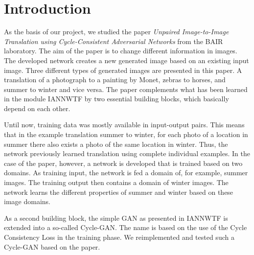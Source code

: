 \documentclass[fleqn,10pt]{SelfArx} %
\begin{document}
\maketitle
\tableofcontents
\thispagestyle{empty} %


\section*{Introduction}
As the basis of our project, we studied the paper \textit{Unpaired Image-to-Image Translation using Cycle-Consistent Adversarial Networks} from the \ac{BAIR} laboratory. The aim of the paper is to change different information in images. The developed network creates a new generated image based on an existing input image. Three different types of generated images are presented in this paper. A translation of a photograph to a painting by Monet, zebras to horses, and summer to winter and vice versa. The paper complements what has been learned in the module \ac{IANNWTF} by two essential building blocks, which basically depend on each other.~\cite{image-to-image-ccan}

Until now, training data was mostly available in input-output pairs. This means that in the example translation summer to winter, for each photo of a location in summer there also exists a photo of the same location in winter. Thus, the network previously learned translation using complete individual examples. In the case of the paper, however, a network is developed that is trained based on two domains. As training input, the network is fed a domain of, for example, summer images. The training output then contains a domain of winter images. The network learns the different properties of summer and winter based on these image domains.~\cite{image-to-image-ccan}

As a second building block, the simple \ac{GAN} as presented in \ac{IANNWTF} is extended into a so-called Cycle-\ac{GAN}. The name is based on the use of the Cycle Consistency Loss in the training phase. We reimplemented and tested such a Cycle-\ac{GAN} based on the paper.~\cite{image-to-image-ccan}

\end{document}
